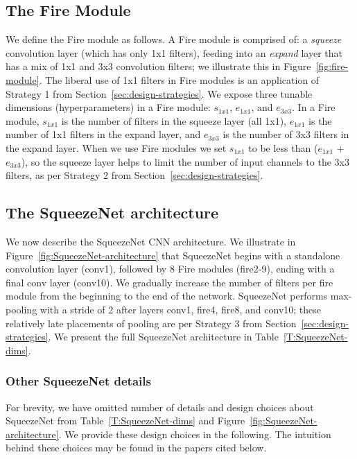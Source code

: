\documentclass{article} \usepackage{iclr2017_conference,times}
\def\vsp{\vspace{-0.15in}}
\begin{document}
\subsection{The Fire Module}
\label{sec:fire-module}
\vsp

We define the Fire module as follows.
A Fire module is comprised of: a {\em squeeze} convolution layer (which has only 1x1 filters), feeding into an {\em expand} layer that has a mix of 1x1 and 3x3 convolution filters; we illustrate this in Figure~\ref{fig:fire-module}.
The liberal use of 1x1 filters in Fire modules is an application of Strategy 1 from Section~\ref{sec:design-strategies}.
We expose three tunable dimensions (hyperparameters) in a Fire module: $s_{1x1}$, $e_{1x1}$, and $e_{3x3}$.
In a Fire module, $s_{1x1}$ is the number of filters in the squeeze layer (all 1x1), $e_{1x1}$ is the number of 1x1 filters in the expand layer, and $e_{3x3}$ is the number of 3x3 filters in the expand layer.
When we use Fire modules we set $s_{1x1}$ to be less than ($e_{1x1}$ + $e_{3x3}$), so the squeeze layer helps to limit the number of input channels to the 3x3 filters, as  per Strategy 2 from Section~\ref{sec:design-strategies}.

\subsection{The SqueezeNet architecture}
\label{sec:squeezenet-arch}
\vsp

We now describe the SqueezeNet CNN architecture. We illustrate in Figure~\ref{fig:SqueezeNet-architecture} that SqueezeNet begins with a standalone convolution layer (conv1), followed by 8 Fire modules (fire2-9), ending with a final conv layer (conv10).
We gradually increase the number of filters per fire module from the beginning to the end of the network.
SqueezeNet performs max-pooling with a stride of 2 after layers conv1, fire4, fire8, and conv10; these relatively late placements of pooling are per Strategy 3 from Section~\ref{sec:design-strategies}.
We present the full SqueezeNet architecture in Table~\ref{T:SqueezeNet-dims}.

\subsubsection{Other SqueezeNet details}
\label{sec:squeezenet-details}
\vspace{-0.1in}

For brevity, we have omitted number of details and design choices about SqueezeNet from Table~\ref{T:SqueezeNet-dims} and Figure~\ref{fig:SqueezeNet-architecture}.
We provide these design choices in the following.
The intuition behind these choices may be found in the papers cited below.
\end{document}
